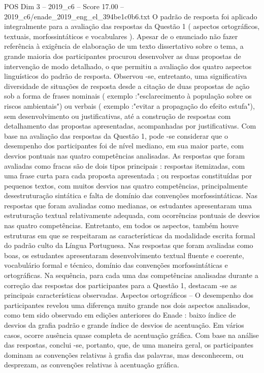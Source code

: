 \begin{textsample}{POS Dim 3 – 2019\_c6 – Score 17.00 – 2019\_c6/enade\_2019\_eng\_el\_394be1c0b6.txt}
O padrão de resposta foi aplicado integralmente para a avaliação das respostas da Questão 1 ( aspectos ortográficos, textuais, morfossintáticos e vocabulares ).
Apesar de o enunciado não fazer referência à exigência de elaboração de um texto dissertativo sobre o tema, a grande maioria dos participantes procurou desenvolver as duas propostas de intervenção de modo detalhado, o que permitiu a avaliação dos quatro aspectos linguísticos do padrão de resposta.
Observou -se, entretanto, uma significativa diversidade de situações de resposta desde a citação de duas propostas de ação sob a forma de frases nominais ( exemplo :"esclarecimento à população sobre os riscos ambientais") ou verbais ( exemplo :"evitar a propagação do efeito estufa"), sem desenvolvimento ou justificativas, até a construção de respostas com detalhamento das propostas apresentadas, acompanhadas por justificativas.
Com base na avaliação das respostas da Questão 1, pode -se considerar que o desempenho dos participantes foi de nível mediano, em sua maior parte, com desvios pontuais nas quatro competências analisadas.
As respostas que foram avaliadas como fracas são de dois tipos principais : respostas itemizadas, com uma frase curta para cada proposta apresentada ; ou respostas constituídas por pequenos textos, com muitos desvios nas quatro competências, principalmente desestruturação sintática e falta de domínio das convenções morfossintáticas.
Nas respostas que foram avaliadas como medianas, os estudantes apresentaram uma estruturação textual relativamente adequada, com ocorrências pontuais de desvios nas quatro competências.
Entretanto, em todos os aspectos, também houve estruturas em que se respeitaram as características da modalidade escrita formal do padrão culto da Língua Portuguesa.
Nas respostas que foram avaliadas como boas, os estudantes apresentaram desenvolvimento textual fluente e coerente, vocabulário formal e técnico, domínio das convenções morfossintáticas e ortográficas.
Na sequência, para cada uma das competências analisadas durante a correção das respostas dos participantes para a Questão 1, destacam -se as principais características observadas.
Aspectos ortográficos – O desempenho dos participantes revelou uma diferença muito grande nos dois aspectos analisados, como tem sido observado em edições anteriores do Enade : baixo índice de desvios da grafia padrão e grande índice de desvios de acentuação.
Em vários casos, ocorre ausência quase completa de acentuação gráfica.
Com base na análise das respostas, conclui -se, portanto, que, de uma maneira geral, os participantes dominam as convenções relativas à grafia das palavras, mas desconhecem, ou desprezam, as convenções relativas à acentuação gráfica.

\end{textsample}
